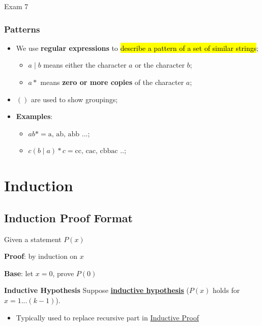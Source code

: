 \documentclass{note}
\begin{document}
\begin{note}{Exam 7}
	\subsubsection{Patterns}

	\begin{itemize}
	    \item We use \textbf{regular expressions} to \hl{describe a pattern of a set of similar strings};
		\begin{itemize}
		    \item $ a \mid b $ means either the character $ a $ or the character $ b $;
		    \item $ a* $ means \textbf{zero or more copies} of the character $ a $;
		\end{itemize}
	    \item $ () $ are used to show groupings;
	    \item \textbf{Examples}:
		\begin{itemize}
		    \item $ ab* = \text{a, ab, abb ...} $;
		    \item $ c \left( b \mid a \right) * c = \text{cc, cac, cbbac ..} $;
		\end{itemize}
	\end{itemize}

	\section{Induction}

	\subsection{Induction Proof Format}

	\begin{center}
		Given a statement $ P(x) $
	\end{center}

	\begin{tcolorbox}

		\textbf{Proof}: by induction on $ x $

		\textbf{Base}: let $ x = 0 $, prove $ P(0) $

		\textbf{Inductive Hypothesis} Suppose \underline{\textbf{inductive hypothesis}} ($ P(x) $ holds for
		$ x = 1...(k - 1) $).
		\begin{itemize}
			\item Typically used to replace recursive part in \underline{Inductive Proof}
		\end{itemize}


\end{tcolorbox}
\end{note}
\end{document}
